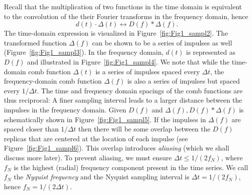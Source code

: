 Recall that the multiplication of two functions in 
the time domain is equivalent to the convolution of the their Fourier transforms in the frequency domain, 
hence
\noindent
\begin{equation}
d(t) \cdot \Delta (t) \leftrightarrow D(f) * \Delta (f).
\end{equation}	 
The time-domain expression is visualized in Figure~\ref{fig:Fig1_sampl2}.
\noindent
The transformed function $\Delta(f)$ can be shown to be a series of impulses as well (Figure~\ref{fig:Fig1_sampl3}).
\noindent
In the frequency domain, $d(t)$ is represented as $D(f)$ and illustrated in Figure~\ref{fig:Fig1_sampl4}.
We note that while the time-domain comb function $\Delta(t)$ is a series of impulses spaced every $\Delta t$,
the frequency-domain comb function $\Delta(f)$ is also a series of impulses but spaced every $1/\Delta t$.
The time and frequency domain spacings of the comb
functions are thus reciprocal: A finer sampling interval leads to a larger distance between the impulses in the
frequency domain.
\noindent
Given $D(f)$ and $\Delta(f), D(f) * \Delta(f)$ is schematically shown in Figure~\ref{fig:Fig1_sampl5}.
\noindent
If the impulses in $\Delta(f)$ are spaced  closer than $1/\Delta t$ then there will be some overlap between the $D(f)$ replicas
that are centered at the location of each impulse (see Figure~\ref{fig:Fig1_sampl6}).
\noindent
This overlap introduces \emph{aliasing} (which we shall discuss more later).  To prevent aliasing, we must ensure $\Delta t \leq 1/(2 f_N)$,
where $f_N$ is the highest (radial) frequency component present in the time series.  We call $f_N$ the
\emph{Nyquist frequency} and the Nyquist sampling interval is $\Delta t  =  1/(2 f_N)$, hence $f_N = 1/(2 \Delta t)$.
